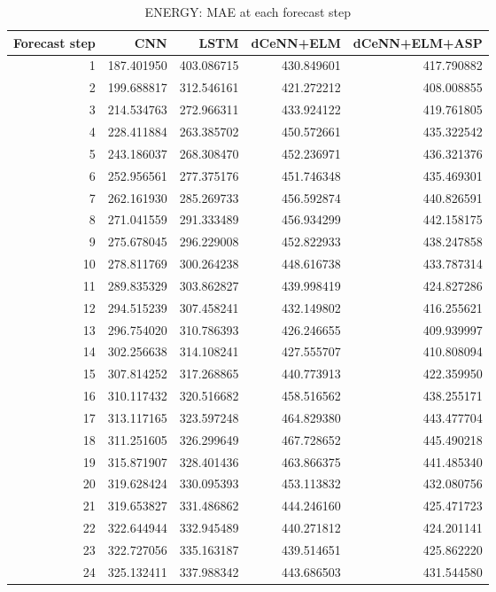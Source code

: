 \begin{table}
\caption{ENERGY: MAE at each forecast step}
\begin{tabular}{rrrrr}
\toprule
Forecast step & CNN & LSTM & dCeNN+ELM & dCeNN+ELM+ASP \\
\midrule
1 & 187.401950 & 403.086715 & 430.849601 & 417.790882 \\
2 & 199.688817 & 312.546161 & 421.272212 & 408.008855 \\
3 & 214.534763 & 272.966311 & 433.924122 & 419.761805 \\
4 & 228.411884 & 263.385702 & 450.572661 & 435.322542 \\
5 & 243.186037 & 268.308470 & 452.236971 & 436.321376 \\
6 & 252.956561 & 277.375176 & 451.746348 & 435.469301 \\
7 & 262.161930 & 285.269733 & 456.592874 & 440.826591 \\
8 & 271.041559 & 291.333489 & 456.934299 & 442.158175 \\
9 & 275.678045 & 296.229008 & 452.822933 & 438.247858 \\
10 & 278.811769 & 300.264238 & 448.616738 & 433.787314 \\
11 & 289.835329 & 303.862827 & 439.998419 & 424.827286 \\
12 & 294.515239 & 307.458241 & 432.149802 & 416.255621 \\
13 & 296.754020 & 310.786393 & 426.246655 & 409.939997 \\
14 & 302.256638 & 314.108241 & 427.555707 & 410.808094 \\
15 & 307.814252 & 317.268865 & 440.773913 & 422.359950 \\
16 & 310.117432 & 320.516682 & 458.516562 & 438.255171 \\
17 & 313.117165 & 323.597248 & 464.829380 & 443.477704 \\
18 & 311.251605 & 326.299649 & 467.728652 & 445.490218 \\
19 & 315.871907 & 328.401436 & 463.866375 & 441.485340 \\
20 & 319.628424 & 330.095393 & 453.113832 & 432.080756 \\
21 & 319.653827 & 331.486862 & 444.246160 & 425.471723 \\
22 & 322.644944 & 332.945489 & 440.271812 & 424.201141 \\
23 & 322.727056 & 335.163187 & 439.514651 & 425.862220 \\
24 & 325.132411 & 337.988342 & 443.686503 & 431.544580 \\

\end{tabular}
\end{table}
